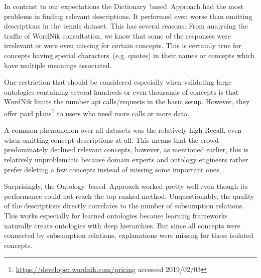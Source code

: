 In contrast to our expectations the Dictionary~based~Approach had the most problems in finding relevant descriptions. It performed even worse than omitting descriptions in the tennis dataset. This has several reasons: From analysing the traffic of WordNik consultation, we know that some of the responses were irrelevant or were even missing for certain concepts. This is certainly true for concepts having special characters~(e.g. quotes) in their names or concepts which have multiple meanings associated. 

One restriction that should be considered especially when validating large ontologies containing several hundreds or even thousands of concepts is that WordNik limits the number \gls{api} calls/requests in the basic setup. However, they offer paid plans\footnote{\url{https://developer.wordnik.com/pricing} accessed 2019/02/03} to users who need more calls or more data.

A common phenomenon over all datasets was the relatively high Recall, even when omitting concept descriptions at all. This means that the crowd predominately declined relevant concepts, however, as mentioned earlier, this is relatively unproblematic because domain experts and ontology engineers rather prefer deleting a few concepts instead of missing some important ones. 

Surprisingly, the Ontology~based~Approach worked pretty well even though its performance could not reach the top ranked method. Unquestionably,
the quality of the descriptions directly correlates to the number of subsumption relations. This works especially for learned ontologies because learning frameworks naturally create ontologies with deep hierarchies. But since all concepts were connected by subsumption relations, explanations were missing for those isolated concepts. 


